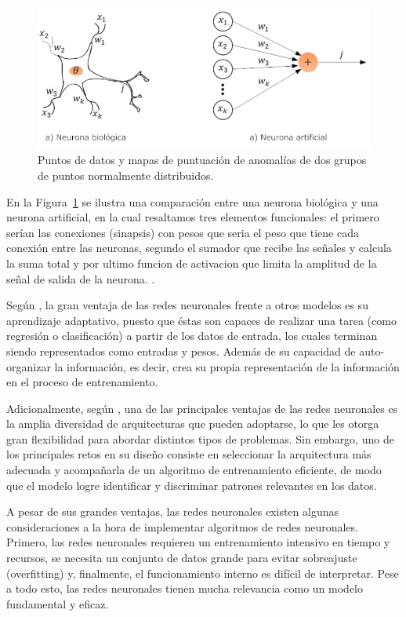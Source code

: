 \documentclass[11pt,a4paper,spanish]{book}
\numberwithin{equation}{chapter}
\numberwithin{figure}{chapter}
\begin{document}
\begin{figure}[h]
    \centering
    \includegraphics[width=1.0\textwidth]{media/neuona-artificial.png}
    \caption{Puntos de datos y mapas de puntuación de anomalías de dos grupos de puntos 
    normalmente distribuidos.  \protect\cite{fernandez2013redes} }
    \label{fig:figNauronaArtificial}
\end{figure}


En la Figura~\ref{fig:figNauronaArtificial} se ilustra una comparación entre una neurona 
biológica y una neurona artificial, en la cual resaltamos tres elementos funcionales: 
el primero serían las conexiones (sinapsis) con pesos que seria el peso que tiene cada 
conexión entre las neuronas, segundo el sumador que recibe las señales y calcula la suma 
total y por ultimo funcion de activacion que limita la amplitud de la señal de salida de 
la neurona. \cite{fernandez2013redes}.


Según \cite{rivera2007redes}, la gran ventaja de las redes neuronales frente a otros 
modelos es su aprendizaje adaptativo, puesto que éstas son capaces de realizar una 
tarea (como regresión o clasificación) a partir de los datos de entrada, los cuales 
terminan siendo representados como entradas y pesos.  Además de su capacidad de 
auto-organizar la información, es decir, crea su propia representación de la 
información en el proceso de entrenamiento. 


Adicionalmente, según \cite{varela2011redes}, una de las principales ventajas de las 
redes neuronales es la amplia diversidad de arquitecturas que pueden adoptarse, lo que 
les otorga gran flexibilidad para abordar distintos tipos de problemas. Sin embargo, 
uno de los principales retos en su diseño consiste en seleccionar la arquitectura más 
adecuada y acompañarla de un algoritmo de entrenamiento eficiente, de modo que el modelo 
logre identificar y discriminar patrones relevantes en los datos. 


A pesar de sus grandes ventajas, las redes neuronales existen algunas consideraciones a 
la hora de implementar algoritmos de redes neuronales. Primero, las redes neuronales 
requieren un entrenamiento intensivo en tiempo y recursos, se necesita un conjunto de 
datos grande para evitar sobreajuste (overfitting) y, finalmente, el funcionamiento 
interno es difícil de interpretar. Pese a todo esto, las redes neuronales tienen mucha 
relevancia como un modelo fundamental y eficaz. \cite{larranaga2021redes}
\end{document}
